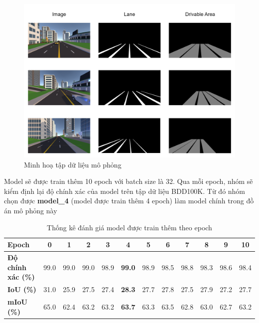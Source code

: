 \begin{figure}[!hbt]
\begin{center}
    \includegraphics[width=14.5cm]{img/4_Implement/ai/simulation_data.png}
    \caption{Minh hoạ tập dữ liệu mô phỏng}
\end{center}
\end{figure}
\noindent Model sẽ được train thêm 10 epoch với batch size là 32. Qua mỗi epoch, nhóm sẽ kiểm định lại độ chính xác của model trên tập dữ liệu BDD100K. Từ đó nhóm chọn được \textbf{model\_4} (model được train thêm 4 epoch) làm model chính trong đồ án mô phỏng này
\begin{table}[!hbt]
\begin{tabular}{@{}lccccccccccc@{}}
\toprule
\textbf{Epoch}             & \textbf{0} & \textbf{1} & \textbf{2} & \textbf{3} & \textbf{4}    & \textbf{5} & \textbf{6} & \textbf{7} & \textbf{8} & \textbf{9} & \textbf{10} \\ \midrule
\textbf{Độ chính xác (\%)} & 99.0       & 99.0       & 99.0       & 98.9       & \textbf{99.0} & 98.9       & 98.5       & 98.8       & 98.3       & 98.6       & 98.4        \\
\textbf{IoU (\%)}          & 31.0       & 25.9       & 27.5       & 27.4       & \textbf{28.3} & 27.7       & 27.8       & 27.5       & 27.9       & 27.2       & 27.7        \\
\textbf{mIoU (\%)}         & 65.0       & 62.4       & 63.2       & 63.2       & \textbf{63.7} & 63.3       & 63.5       & 62.8       & 63.0       & 62.7       & 63.2        \\ \bottomrule
\end{tabular}
\caption{Thống kê đánh giá model được train thêm theo epoch}
\end{table}
